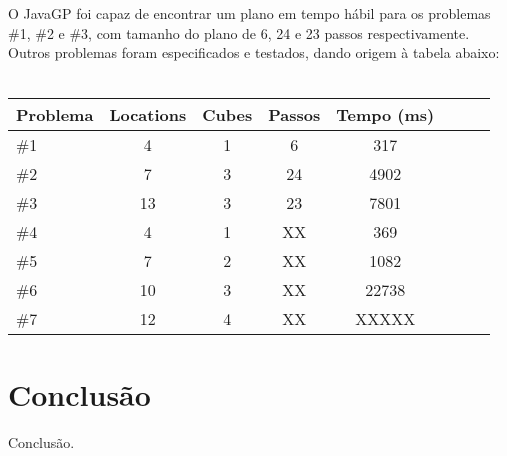 \documentclass[letterpaper]{article}
\begin{document}
O JavaGP foi capaz de encontrar um plano em tempo hábil para os problemas \#1, \#2 e \#3, com tamanho do plano de 6, 24 e 23 passos respectivamente. Outros problemas foram especificados e testados, dando origem à tabela abaixo: \\
\\
\begin{tabular}{l*{6}{c}r}
Problema              & Locations & Cubes & Passos & Tempo (ms) \\
\hline
\#1                   &         4 &     1 &      6 &        317 \\
\#2                   &         7 &     3 &     24 &       4902 \\
\#3                   &        13 &     3 &     23 &       7801 \\
\hline
\#4                   &         4 &     1 &     XX &        369 \\
\#5                   &         7 &     2 &     XX &       1082 \\
\#6                   &        10 &     3 &     XX &      22738 \\
\#7                   &        12 &     4 &     XX &      XXXXX \\
\end{tabular}

\section{Conclusão}

Conclusão.
\end{document}
